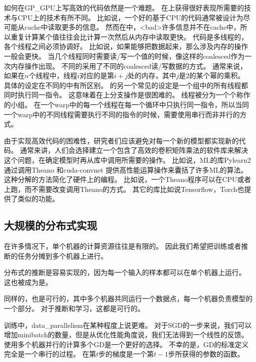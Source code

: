 如何在\gls{GP_GPU}上写高效的代码依然是一个难题。
在上获得很好表现所需要的技术与CPU上的技术有所不同。
比如说，一个好的基于CPU的代码通常被设计为尽可能从cache中读取更多的信息。
然而在中，<bad>许多信息并不在cache中，所以重复计算某个值往往会比计算一次然后从内存中读取更快。
代码是多线程的，各个线程之间必须协调好。
比如说，如果能够把数据起来，那么涉及内存的操作一般会更快。
当几个线程同时需要读/写一个值的时候，像这样的\gls{coalesced}作为一次内存操作出现。
不同的采用了不同的\gls{coalesced}读/写数据的方式。
通常来说，如果在$n$个线程中，线程$i$对应的是第$i+j$处的内存，其中$j$是$2$的某个幂的乘积。
具体的设定在不同的中有所区别。
的另一个常见的设定是一个组中的所有线程都同时执行同一指令。
这意味着在上分支操作是很困难的。
线程被分为一个个称作的小组。
在一个\gls{warp}中的每一个线程在每一个循环中只执行同一指令，所以当同一个\gls{warp}中的不同线程需要执行不同的指令的时候，需要使用串行而非并行的方式。


由于实现高效代码的困难性，研究者们应该避免对每一个新的模型都实现新的代码。
通常来讲，人们会选择建立一个包含了高效的卷积矩阵乘法的软件库来解决这个问题，在确定模型时再从库中调用所需要的操作。
比如说，\gls{ML}的库Pylearn2  \citep{pylearn2_arxiv_2013}通过调用Theano \citep{bergstra+al:2010-scipy-short,Bastien-2012}和cuda-convnet \citep{Krizhevsky2010tr}提供高性能运算操作来囊括了许多\gls{ML}的算法。
这种分解的方法简化了硬件上的编程。
比如说，一个Theano程序可以在CPU或者上跑，而不需要改变调用Theano的方式。
其它的库比如说Tensorflow\citep{tensorflow}，Torch\citep{Torch-2011}也提供了类似的功能。


\subsection{大规模的分布式实现}
\label{sec:large_scale_distributed_implementations}

在许多情况下，单个机器的计算资源往往是有限的。
因此我们希望把训练或者推断的任务分摊到多个机器上进行。

分布式的推断是容易实现的，因为每一个输入的样本都可以在单个机器上运行。
这也被成为是。

同样的，也是可行的，其中多个机器共同运行一个数据点，每一个机器负责模型的一个部分。
对于推断和学习，这都是可行的。


训练中，\gls{data_parallelism}在某种程度上说更难。
对于\gls{SGD}的一步来说，我们可以增加\gls{minibatch}的数量，但是从优化性能角度说，我们无法得到一个线性的反馈。
使用多个机器并行的计算多个\gls{GD}是一个更好的选择。
不幸的是，\gls{GD}的标准定义完全是一个串行的过程。
在第$t$步的梯度是一个第$t-1$步所获得的参数的函数。


